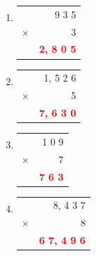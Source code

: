 \documentclass[11pt, a4paper]{article}
\newcommand{\answerline}[1]{\textcolor{red}{\textbf{#1}}}
\begin{document}
\begin{enumerate}[label=\arabic*.]
    \vspace{1cm}
    \setcounter{enumi}{3}
    \item \begin{tabular}[t]{c r}
          & 9 3 5 \\
        $\times$ & 3 \\ \hline
          & \answerline{2, 8 0 5} \\ \hline
    \end{tabular}
    \hfill
    \setcounter{enumi}{8}
    \item \begin{tabular}[t]{c r}
          & 1, 5 2 6 \\
        $\times$ & 5 \\ \hline
          & \answerline{7, 6 3 0} \\ \hline
    \end{tabular}

    \vspace{1cm}
    \setcounter{enumi}{4}
    \item \begin{tabular}[t]{c r}
          & 1 0 9 \\
        $\times$ & 7 \\ \hline
          & \answerline{7 6 3} \\ \hline
    \end{tabular}
    \hfill
    \setcounter{enumi}{9}
    \item \begin{tabular}[t]{c r}
          & 8, 4 3 7 \\
        $\times$ & 8 \\ \hline
          & \answerline{6 7, 4 9 6} \\ \hline
    \end{tabular}
\end{enumerate}

\pagebreak
\end{document}
